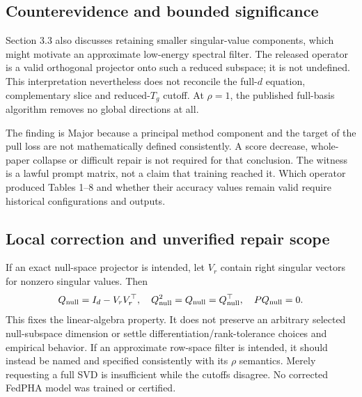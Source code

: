 \documentclass[10pt]{article}
\begin{document}
\subsection*{Counterevidence and bounded significance}
Section 3.3 also discusses retaining smaller singular-value components, which might motivate an approximate low-energy spectral filter. The released operator is a valid orthogonal projector onto such a reduced subspace; it is not undefined. This interpretation nevertheless does not reconcile the full-\(d\) equation, complementary slice and reduced-\(T_g\) cutoff. At \(\rho=1\), the published full-basis algorithm removes no global directions at all.\par
The finding is Major because a principal method component and the target of the pull loss are not mathematically defined consistently. A score decrease, whole-paper collapse or difficult repair is not required for that conclusion. The witness is a lawful prompt matrix, not a claim that training reached it. Which operator produced Tables 1–8 and whether their accuracy values remain valid require historical configurations and outputs.\par
\subsection*{Local correction and unverified repair scope}
If an exact null-space projector is intended, let \(V_r\) contain right singular vectors for nonzero singular values. Then \[Q_{\rm null}=I_d-V_rV_r^\top,\quad
 Q_{\rm null}^2=Q_{\rm null}=Q_{\rm null}^\top,\quad
 PQ_{\rm null}=0.\] This fixes the linear-algebra property. It does not preserve an arbitrary selected null-subspace dimension or settle differentiation/rank-tolerance choices and empirical behavior. If an approximate row-space filter is intended, it should instead be named and specified consistently with its \(\rho\) semantics. Merely requesting a full SVD is insufficient while the cutoffs disagree. No corrected FedPHA model was trained or certified.\par
\end{document}
